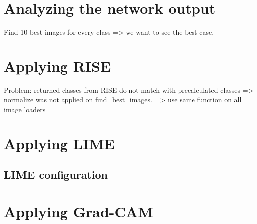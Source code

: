 \section{Analyzing the network output}
Find 10 best images for every class => we want to see the best case.


\section{Applying RISE}
Problem: returned classes from RISE do not match with precalculated classes
=> normalize was not applied on find\_best\_images.
=> use same function on all image loaders


\section{Applying LIME}


\subsection{LIME configuration}

\section{Applying Grad-CAM}
